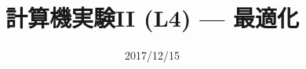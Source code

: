 \documentclass[dvipdfmx]{beamer}
\title{計算機実験II (L4) --- 最適化}
\date{2017/12/15}
\begin{document}
\begin{frame}
  \titlepage
  \tableofcontents
\end{frame}









\end{document}
